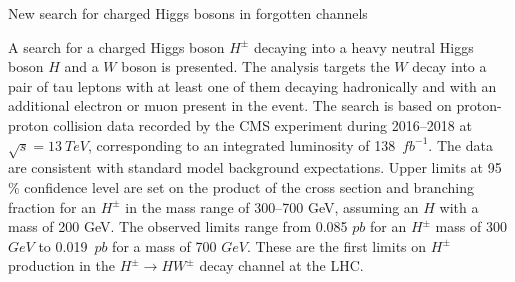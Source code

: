 \begin{MyArticle}[enhanced, tikz={rotate=0}, boxrule=1pt, titlerule=0pt, width=0.25\textwidth]{New
    search for charged Higgs bosons in forgotten channels}
  \begin{multicols}{2}
  A search for a charged Higgs boson $H^{\pm}$ decaying
  into a heavy neutral Higgs boson $H$ and a $W$ boson
  is presented. The analysis targets the $W$ decay into a pair
  of tau leptons with at least one of them decaying hadronically and
  with an additional electron or muon present in the event.
  The search is based on proton-proton collision data
  recorded by the CMS experiment during 2016--2018 at
  $\sqrt{s} = 13~TeV$, corresponding to an integrated
  luminosity of 138~$fb^{-1}$. The data are consistent with
  standard model background expectations. Upper limits at 95$\%$ confidence
  level are set on the product of the cross section and branching fraction
  for an $H^{\pm}$ in the mass range of 300--700 GeV, assuming an $H$ 
  with a mass of 200 GeV. The observed limits range from
  0.085 $pb$ for an $H^{\pm}$ mass of
  300 $GeV$ to 0.019~$pb$ for a mass of
  700 $GeV$. These are the first limits on $H^{\pm}$
  production in the $H^{\pm} \to H W^{\pm}$ decay channel at the LHC. 
  \end{multicols}
\end{MyArticle}
